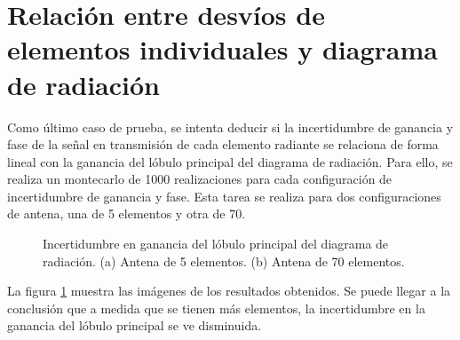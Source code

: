 \section{Relación entre desvíos de elementos individuales y diagrama de radiación}
\label{sc:relationDispersionRadiationPattern}

Como último caso de prueba, se intenta deducir si la incertidumbre de ganancia y fase de la señal en transmisión de cada elemento
radiante se relaciona de forma lineal con la ganancia del lóbulo principal del diagrama de radiación. Para ello, se realiza
un montecarlo de 1000 realizaciones para cada configuración de incertidumbre de ganancia y fase. Esta tarea se realiza para dos
configuraciones de antena, una de 5 elementos y otra de 70.
\begin{figure}[H]
	\centering
	\caption{Incertidumbre en ganancia del lóbulo principal del diagrama de radiación. (a) Antena de 5 elementos. (b) Antena de 
	70 elementos.}
	\label{fig:antennaMontecarlo}
\end{figure}

La figura \ref{fig:antennaMontecarlo} muestra las imágenes de los resultados obtenidos. Se puede llegar a la conclusión que a
medida que se tienen más elementos, la incertidumbre en la ganancia del lóbulo principal se ve disminuida.



